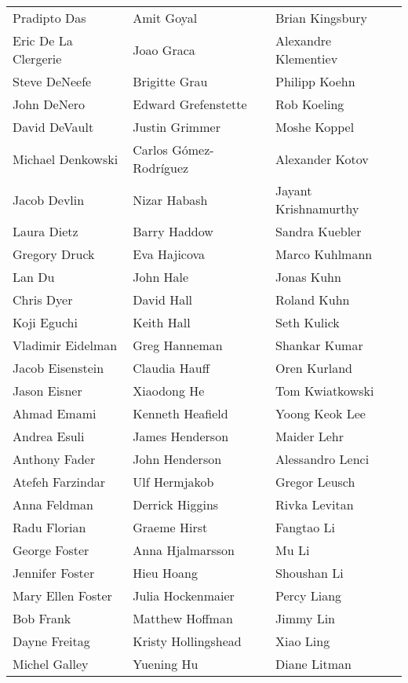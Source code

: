 \begin{tabular*}{\textwidth}{@{\extracolsep{\fill}} lll }
  Pradipto Das  & Amit Goyal  & Brian Kingsbury \\
  Eric De La Clergerie  & Joao Graca  & Alexandre Klementiev \\
  Steve DeNeefe  & Brigitte Grau  & Philipp Koehn \\
  John DeNero  & Edward Grefenstette  & Rob Koeling \\
  David DeVault  & Justin Grimmer  & Moshe Koppel \\
  Michael Denkowski  & Carlos Gómez-Rodríguez  & Alexander Kotov \\
  Jacob Devlin  & Nizar Habash  & Jayant Krishnamurthy \\
  Laura Dietz  & Barry Haddow  & Sandra Kuebler \\
  Gregory Druck  & Eva Hajicova  & Marco Kuhlmann \\
  Lan Du  & John Hale  & Jonas Kuhn \\
  Chris Dyer  & David Hall  & Roland Kuhn \\
  Koji Eguchi  & Keith Hall  & Seth Kulick \\
  Vladimir Eidelman  & Greg Hanneman  & Shankar Kumar \\
  Jacob Eisenstein  & Claudia Hauff  & Oren Kurland \\
  Jason Eisner  & Xiaodong He  & Tom Kwiatkowski \\
  Ahmad Emami  & Kenneth Heafield  & Yoong Keok Lee \\
  Andrea Esuli  & James Henderson  & Maider Lehr \\
  Anthony Fader  & John Henderson  & Alessandro Lenci \\
  Atefeh Farzindar  & Ulf Hermjakob  & Gregor Leusch \\
  Anna Feldman  & Derrick Higgins  & Rivka Levitan \\
  Radu Florian  & Graeme Hirst  & Fangtao Li \\
  George Foster  & Anna Hjalmarsson  & Mu Li \\
  Jennifer Foster  & Hieu Hoang  & Shoushan Li \\
  Mary Ellen Foster  & Julia Hockenmaier  & Percy Liang \\
  Bob Frank  & Matthew Hoffman  & Jimmy Lin \\
  Dayne Freitag  & Kristy Hollingshead  & Xiao Ling \\
  Michel Galley  & Yuening Hu  & Diane Litman \\

\end{tabular*}
